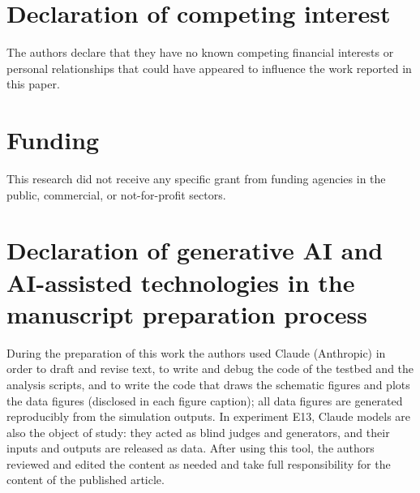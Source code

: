 \documentclass[preprint,12pt,authoryear]{elsarticle}
\theoremstyle{definition}
\begin{document}
\section*{Declaration of competing interest}
The authors declare that they have no known competing financial interests or personal relationships that could have appeared to influence the work reported in this paper.

\section*{Funding}
This research did not receive any specific grant from funding agencies in the public, commercial, or not-for-profit sectors.
\fi

\section*{Declaration of generative AI and AI-assisted technologies in the manuscript preparation process}
During the preparation of this work the authors used Claude (Anthropic) in order to draft and revise text, to write and debug the code of the testbed and the analysis scripts, and to write the code that draws the schematic figures and plots the data figures (disclosed in each figure caption); all data figures are generated reproducibly from the simulation outputs. In experiment E13, Claude models are also the object of study: they acted as blind judges and generators, and their inputs and outputs are released as data. After using this tool, the authors reviewed and edited the content as needed and take full responsibility for the content of the published article.
\end{document}
